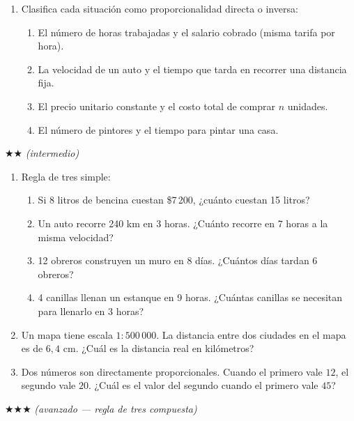 \documentclass[11pt, letterpaper]{article}
\begin{document}
\begin{enumerate}[label=\textbf{\arabic*.}, leftmargin=*]
\item Clasifica cada situaci\'on como proporcionalidad directa o inversa:
\begin{enumerate}[label=\alph*)]
  \item El n\'umero de horas trabajadas y el salario cobrado (misma tarifa por hora).
  \item La velocidad de un auto y el tiempo que tarda en recorrer una distancia fija.
  \item El precio unitario constante y el costo total de comprar $n$ unidades.
  \item El n\'umero de pintores y el tiempo para pintar una casa.
\end{enumerate}

\end{enumerate}

$\bigstar\bigstar$ \textit{(intermedio)}

\begin{enumerate}[label=\textbf{\arabic*.}, leftmargin=*, resume]

\item Regla de tres simple:
\begin{enumerate}[label=\alph*)]
  \item Si 8 litros de bencina cuestan \$7\,200, ¿cu\'anto cuestan 15 litros?
  \item Un auto recorre 240 km en 3 horas. ¿Cu\'anto recorre en 7 horas a la misma velocidad?
  \item 12 obreros construyen un muro en 8 d\'ias. ¿Cu\'antos d\'ias tardan 6 obreros?
  \item 4 canillas llenan un estanque en 9 horas. ¿Cu\'antas canillas se necesitan para llenarlo en 3 horas?
\end{enumerate}

\item Un mapa tiene escala $1:500\,000$. La distancia entre dos ciudades en el mapa es de $6{,}4$ cm. ¿Cu\'al es la distancia real en kil\'ometros?

\item Dos n\'umeros son directamente proporcionales. Cuando el primero vale $12$, el segundo vale $20$. ¿Cu\'al es el valor del segundo cuando el primero vale $45$?

\end{enumerate}

$\bigstar\bigstar\bigstar$ \textit{(avanzado --- regla de tres compuesta)}
\end{document}
